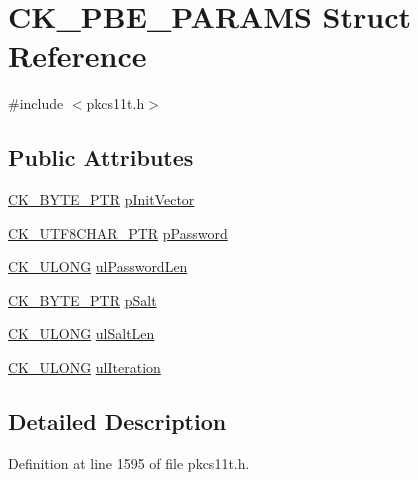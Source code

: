 \hypertarget{struct_c_k___p_b_e___p_a_r_a_m_s}{}\section{C\+K\+\_\+\+P\+B\+E\+\_\+\+P\+A\+R\+A\+MS Struct Reference}
\label{struct_c_k___p_b_e___p_a_r_a_m_s}


{\ttfamily \#include $<$pkcs11t.\+h$>$}

\subsection*{Public Attributes}
\begin{DoxyCompactItemize}
\item 
\hyperlink{pkcs11t_8h_a3d7233a4077fbaf7ae76b64da0a62a21}{C\+K\+\_\+\+B\+Y\+T\+E\+\_\+\+P\+TR} \hyperlink{struct_c_k___p_b_e___p_a_r_a_m_s_af6439037175aecb9ef4b8cd78a25dfce}{p\+Init\+Vector}
\item 
\hyperlink{pkcs11t_8h_af25c3841a3f605e6414f4c9ef5592ed9}{C\+K\+\_\+\+U\+T\+F8\+C\+H\+A\+R\+\_\+\+P\+TR} \hyperlink{struct_c_k___p_b_e___p_a_r_a_m_s_a852949cd067d93ed657f77feb19796df}{p\+Password}
\item 
\hyperlink{pkcs11t_8h_a35181858a3b7a0a81f49d180d8f446ef}{C\+K\+\_\+\+U\+L\+O\+NG} \hyperlink{struct_c_k___p_b_e___p_a_r_a_m_s_a0571a4e448396bcf480e58e3b137e15f}{ul\+Password\+Len}
\item 
\hyperlink{pkcs11t_8h_a3d7233a4077fbaf7ae76b64da0a62a21}{C\+K\+\_\+\+B\+Y\+T\+E\+\_\+\+P\+TR} \hyperlink{struct_c_k___p_b_e___p_a_r_a_m_s_af68023bb005478be6415e430d23cf4a4}{p\+Salt}
\item 
\hyperlink{pkcs11t_8h_a35181858a3b7a0a81f49d180d8f446ef}{C\+K\+\_\+\+U\+L\+O\+NG} \hyperlink{struct_c_k___p_b_e___p_a_r_a_m_s_ada93c47b07a867140453cce890cd17be}{ul\+Salt\+Len}
\item 
\hyperlink{pkcs11t_8h_a35181858a3b7a0a81f49d180d8f446ef}{C\+K\+\_\+\+U\+L\+O\+NG} \hyperlink{struct_c_k___p_b_e___p_a_r_a_m_s_aef88e5c2a740c2fa2ad542ffc3a7fb50}{ul\+Iteration}
\end{DoxyCompactItemize}


\subsection{Detailed Description}


Definition at line 1595 of file pkcs11t.\+h.



